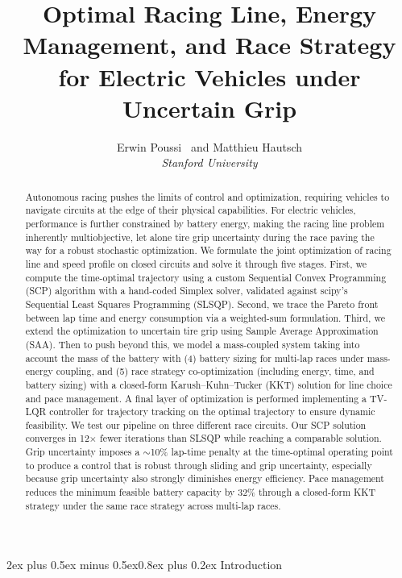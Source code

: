 \documentclass[conf]{new-aiaa}
\title{Optimal Racing Line, Energy Management, and Race Strategy for Electric Vehicles under Uncertain Grip}
\author{
  Erwin Poussi
  \ and
  Matthieu Hautsch\\
  {\normalsize\itshape Stanford University}
}
\makeatletter
\renewcommand\section{\@startsection{section}{1}{\z@}%
  {2ex plus 0.5ex minus 0.5ex}{0.8ex plus 0.2ex}%
  {\normalfont\large\bfseries\centering}}
\makeatother
\begin{document}
\maketitle

\begin{abstract}
Autonomous racing pushes the limits of control and optimization, requiring vehicles to navigate circuits at the edge of their physical capabilities. For electric vehicles, performance is further constrained by battery energy, making the racing line problem inherently multiobjective, let alone tire grip uncertainty during the race paving the way for a robust stochastic optimization. We formulate the joint optimization of racing line and speed profile on closed circuits and solve it through five stages. First, we compute the time-optimal trajectory using a custom Sequential Convex Programming (SCP) algorithm with a hand-coded Simplex solver, validated against scipy's Sequential Least Squares Programming (SLSQP). Second, we trace the Pareto front between lap time and energy consumption via a weighted-sum formulation. Third, we extend the optimization to uncertain tire grip using Sample Average Approximation (SAA). Then to push beyond this, we model a mass-coupled system taking into account the mass of the battery with (4) battery sizing for multi-lap races under mass-energy coupling, and (5) race strategy co-optimization (including energy, time, and battery sizing) with a closed-form Karush--Kuhn--Tucker (KKT) solution for line choice and pace management. A final layer of optimization is performed implementing a TV-LQR controller for trajectory tracking on the optimal trajectory to ensure dynamic feasibility. We test our pipeline on three different race circuits. Our SCP solution converges in 12$\times$ fewer iterations than SLSQP while reaching a comparable solution. Grip uncertainty imposes a ${\sim}$10\% lap-time penalty at the time-optimal operating point to produce a control that is robust through sliding and grip uncertainty, especially because grip uncertainty also strongly diminishes energy efficiency. Pace management reduces the minimum feasible battery capacity by 32\% through a closed-form KKT strategy under the same race strategy across multi-lap races.
\end{abstract}

\section{Introduction}
\end{document}
